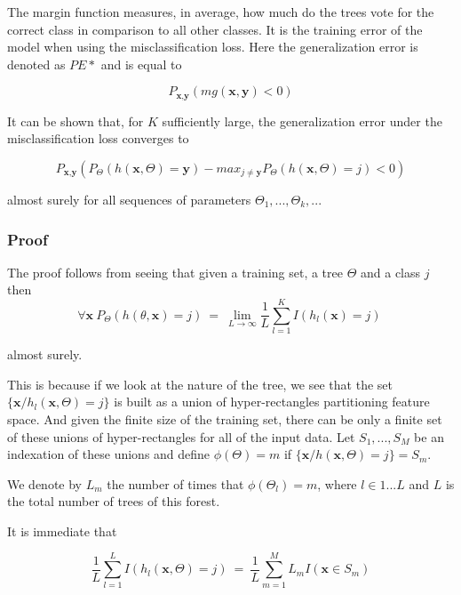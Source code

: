 The margin function measures, in average, how much do the trees vote for the correct class in comparison to all other classes. It is the training error of the model when using the misclassification loss. Here the generalization error is denoted as $PE*$ and is equal to  

\begin{equation}
P_{\textbf{x}, \textbf{y} }(mg(\textbf{x},\textbf{y}) <0)
\end{equation}

 It can be shown that, for $K$ sufficiently large, the generalization error under the misclassification loss converges to

\begin{equation}

 P_{\textbf{x}, \textbf{y} } ( P_{\Theta} (h(\textbf{x}, \Theta) = \textbf{y}) - max_{j \neq \textbf{y}} P_{\Theta} (h(\textbf{x}, \Theta) = j) < 0) 
 \end{equation}

almost surely for all sequences of parameters $\Theta_1, ..., \Theta_k,...$

\subsubsection{Proof}
The proof follows from seeing that given a training set, a tree $\Theta$ and a class $j$ then
\begin{equation}
\forall \textbf{x}   \ P_\Theta(h(\theta,\textbf{x}) = j) \ = \
\lim_{L\to\infty} \frac{1}{L} \sum_{l=1}^K I(h_l(\textbf{x}) = j) \  
\end{equation}

almost surely.

This is because if we look at the nature of the tree, we see that the set $\{\textbf{x} / h_l(\textbf{x}, \Theta) = j \}$ is built as a union of hyper-rectangles partitioning feature space. And given the finite size of the training set, there can be only a finite set of these unions of hyper-rectangles for all of the input data. Let $S_1, ..., S_M$ be an indexation of these unions and define $\phi(\Theta) = m $ if $\{\textbf{x} / h(\textbf{x}, \Theta) = j \} = S_m$.

We denote by $L_m$ the number of times that $\phi(\Theta_l) =m $, where $l \in {1...L}$ and $L$ is the total number of trees of this forest.

It is immediate that

\begin{equation}\label{rf-PEconvergence1}
\frac{1}{L} \sum_{l=1}^L I(h_l(\textbf{x},\Theta) = j) \ = \  \frac{1}{L} \sum_{m=1}^M L_m I(\textbf{x} \in S_m)
\end{equation}

